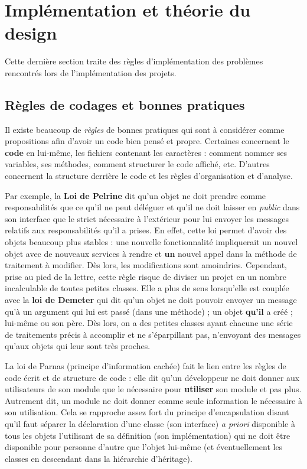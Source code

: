 \documentclass{article}
\begin{document}
\section{Implémentation et théorie du design}
	Cette dernière section traite des règles d'implémentation des problèmes rencontrés lors de l'implémentation des projets.

	\subsection{Règles de codages et bonnes pratiques}
		Il existe beaucoup de \textit{règles} de bonnes pratiques qui sont à considérer comme propositions afin d'avoir un code bien pensé et propre. Certaines concernent le \textbf{code} en lui-même,
		les fichiers contenant les caractères : comment nommer ses variables, ses méthodes, comment structurer le code affiché, etc. D'autres concernent la structure derrière le code et les règles
		d'organisation et d'analyse.

		Par exemple, la \textbf{Loi de Pelrine} dit qu'un objet ne doit prendre comme responsabilités que ce qu'il ne peut déléguer et qu'il ne doit laisser en \textit{public} dans son interface
		que le strict nécessaire à l'extérieur pour lui envoyer les messages relatifs aux responsabilités qu'il a prises. En effet, cette loi permet d'avoir des objets beaucoup plus stables : une
		nouvelle fonctionnalité impliquerait un nouvel objet avec de nouveaux services à rendre et \textbf{un} nouvel appel dans la méthode de traitement à modifier. Dès lors, les modifications sont
		amoindries. Cependant, prise au pied de la lettre, cette règle risque de diviser un projet en un nombre incalculable de toutes petites classes. Elle a plus de sens lorsqu'elle est couplée
		avec la \textbf{loi de Demeter} qui dit qu'un objet ne doit pouvoir envoyer un message qu'à un argument qui lui est passé (dans une méthode) ; un objet \textbf{qu'il} a créé ; lui-même
		ou son père. Dès lors, on a des petites classes ayant chacune une série de traitements précis à accomplir et ne s'éparpillant pas, n'envoyant des messages qu'aux objets qui leur sont très
		proches.

		La loi de Parnas (principe d'information cachée) fait le lien entre les règles de code écrit et de structure de code : elle dit qu'un développeur ne doit donner aux utilisateurs de son module
		que le nécessaire pour \textbf{utiliser} son module et pas plus. Autrement dit, un module ne doit donner comme seule information le nécessaire à son utilisation. Cela se rapproche assez fort
		du principe d'encapsulation disant qu'il faut séparer la déclaration d'une classe (son interface) \textit{a priori} disponible à tous les objets l'utilisant de sa définition (son
		implémentation) qui ne doit être disponible pour personne d'autre que l'objet lui-même (et éventuellement les classes en descendant dans la hiérarchie d'héritage).
	
\end{document}
